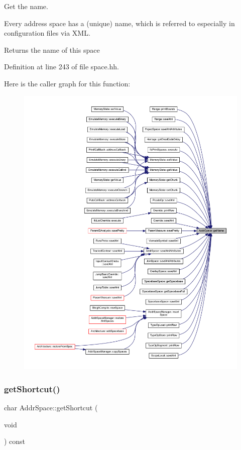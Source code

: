 Get the name. 

Every address space has a (unique) name, which is referred to especially in configuration files via X\+ML. \begin{DoxyReturn}{Returns}
the name of this space 
\end{DoxyReturn}


Definition at line 243 of file space.\+hh.

Here is the caller graph for this function\+:
\nopagebreak
\begin{figure}[H]
\begin{center}
\leavevmode
\includegraphics[width=350pt]{class_addr_space_a0ff86055617ff65ee8961b7c4e6caf98_icgraph}
\end{center}
\end{figure}
\mbox{\label{class_addr_space_aca9d79017012183ca27a1c921444c11c}} 
\subsubsection{\texorpdfstring{getShortcut()}{getShortcut()}}
{\footnotesize\ttfamily char Addr\+Space\+::get\+Shortcut (\begin{DoxyParamCaption}\item[{void}]{ }\end{DoxyParamCaption}) const\hspace{0.3cm}{\ttfamily [inline]}}



